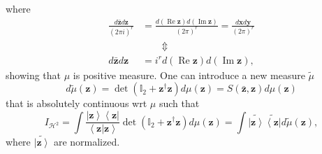 \documentclass[aps,preprint]{revtex4}%
\begin{document}
where
\begin{align}
\frac{d\mathbf{\bar{z}}d\mathbf{z}}{\left(  2\pi i\right)  ^{r}}  &
=\frac{d\left(  \operatorname{Re}\mathbf{z}\right)  d\left(  \operatorname{Im}%
\mathbf{z}\right)  }{\left(  2\pi\right)  ^{r}}=\frac{d\mathbf{x}d\mathbf{y}%
}{\left(  2\pi\right)  ^{r}}\nonumber\\
& \qquad\left.  \Updownarrow\right.  \nonumber\\
d\mathbf{\bar{z}}d\mathbf{z}  & =i^{r}d\left(  \operatorname{Re}%
\mathbf{z}\right)  d\left(  \operatorname{Im}\mathbf{z}\right)  ,
\end{align}
showing that $\mu$ is positive measure. One can introduce a new measure
$\tilde{\mu}$
\begin{equation}
d\tilde{\mu}\left(  \mathbf{z}\right)  =\det\left(  \mathbb{I}_{2}%
+\mathbf{z}^{\dagger}\mathbf{z}\right)  d\mu\left(  \mathbf{z}\right)
=S\left(  \mathbf{\bar{z},z}\right)  d\mu\left(  \mathbf{z}\right)
\end{equation}
that is absolutely continuous wrt $\mu$ such that
\begin{equation}
I_{\mathcal{H}^{2}}=\int\frac{\left\vert \mathbf{z}\right\rangle \left\langle
\mathbf{z}\right\vert }{\left\langle \mathbf{z}\left\vert \mathbf{z}\right.
\right\rangle }\det\left(  \mathbb{I}_{2}+\mathbf{z}^{\dagger}\mathbf{z}%
\right)  d\mu\left(  \mathbf{z}\right)  =\int\widetilde{\left\vert
\mathbf{z}\right\rangle }\widetilde{\left\langle \mathbf{z}\right\vert
}d\tilde{\mu}\left(  \mathbf{z}\right)  ,
\end{equation}
where $\widetilde{\left\vert \mathbf{z}\right\rangle }$ are normalized. 
\end{document}
